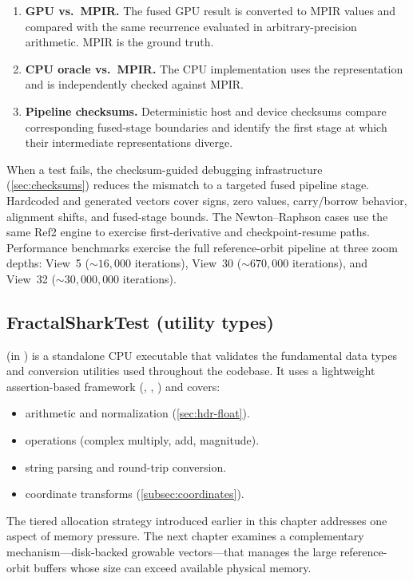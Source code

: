 \begin{enumerate}
  \item \textbf{GPU vs.\ MPIR.}  The fused GPU result is converted to
        MPIR values and compared with the same recurrence evaluated in
        arbitrary-precision arithmetic.  MPIR is the ground truth.
  \item \textbf{CPU oracle vs.\ MPIR.}  The CPU
         implementation uses the
         representation and is independently checked
        against MPIR.
  \item \textbf{Pipeline checksums.}  Deterministic host and device
        checksums compare corresponding fused-stage boundaries and identify
        the first stage at which their intermediate representations diverge.
\end{enumerate}

\noindent
When a test fails, the checksum-guided debugging infrastructure
(\cref{sec:checksums}) reduces the mismatch to a targeted fused pipeline
stage.  Hardcoded and generated vectors cover signs, zero values,
carry/borrow behavior, alignment shifts, and fused-stage bounds.  The
Newton--Raphson cases use the same Ref2 engine to exercise first-derivative
and checkpoint-resume paths.  Performance benchmarks exercise the full
reference-orbit pipeline at three zoom depths: View~5
(${\sim}16{,}000$ iterations), View~30 (${\sim}670{,}000$ iterations), and
View~32 (${\sim}30{,}000{,}000$ iterations).

\subsection{FractalSharkTest (utility types)}
\label{subsec:fractalsharktest}

 (in ) is a standalone
CPU executable that validates the fundamental data types and conversion
utilities used throughout the codebase.  It uses a lightweight
assertion-based framework (, ,
) and covers:

\begin{itemize}
  \item {} arithmetic and normalization
        (\cref{sec:hdr-float}).
  \item {} operations (complex multiply, add,
        magnitude).
  \item {} string parsing and round-trip conversion.
  \item {} coordinate transforms
        (\cref{subsec:coordinates}).
\end{itemize}

The tiered allocation strategy introduced earlier in this chapter addresses one aspect of memory
pressure.  The next chapter examines a complementary mechanism---disk-backed
growable vectors---that manages the large reference-orbit buffers whose size
can exceed available physical memory.
